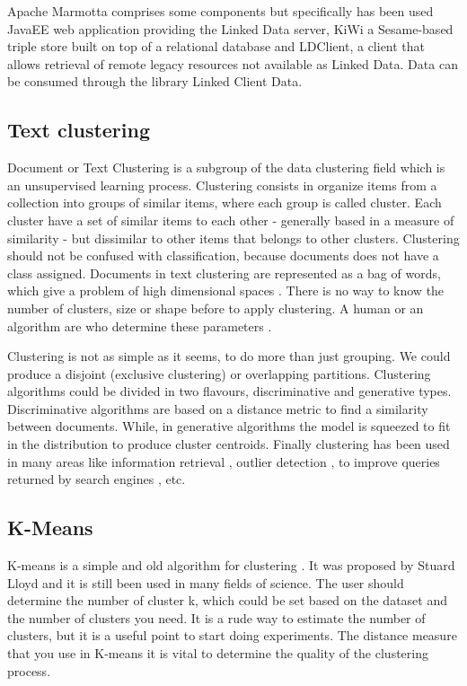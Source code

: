 \documentclass[11pt]{article}
\begin{document}
Apache Marmotta comprises  some components but specifically has been used JavaEE web application providing the Linked Data server, KiWi a Sesame-based triple store built on top of a relational database and  LDClient, a client that allows retrieval of remote legacy resources not available as Linked Data. Data can be consumed %
through the library Linked Client Data.%

\subsection{Text clustering}

Document or Text Clustering \cite{Andrews} is a subgroup of the data clustering field which is an unsupervised learning process. Clustering consists in organize items from a collection into groups of similar items, where each group is called cluster. Each cluster have a set of similar items to each other -  generally based in a measure of similarity - but dissimilar to other items that belongs to other clusters. Clustering should not be confused with classification, because documents does not have a class assigned. Documents in text clustering are represented as a bag of words, which give a problem of high dimensional spaces \cite{Charu}. There is no way to know the number of clusters, size or shape before to apply clustering. A human or an algorithm are who determine these parameters \cite{Bradley} \cite{Greg}.

Clustering is not as simple as it seems, to do more than just grouping. We could produce a disjoint (exclusive clustering) or overlapping partitions. Clustering algorithms could be divided in two flavours, discriminative and generative types. Discriminative algorithms are based on a distance metric to find a similarity between documents. While, in generative algorithms the model is squeezed to fit in the distribution to produce cluster centroids. Finally clustering has been used in many areas like information retrieval \cite{Zamir}, outlier detection \cite{Victoria}, to improve queries returned by search engines \cite{Zamir}, etc. 

\subsection{K-Means}

K-means is a simple and old algorithm for clustering \cite{Anil}. It was proposed by Stuard Lloyd \cite{Lloyd} and it is still been used in many fields of science. The user should determine the number of cluster k, which could be set based on the dataset and the number of clusters you need. It is a rude way to estimate the number of clusters, but it is a useful point to start doing experiments. The distance measure that you use in K-means it is vital to determine the quality of the clustering process. 
\end{document}
